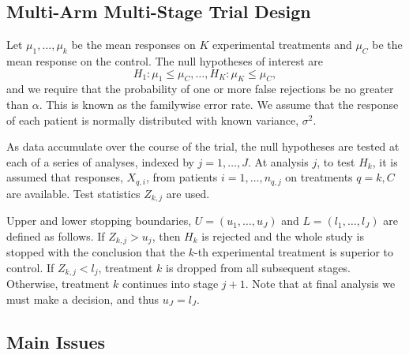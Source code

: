 \documentclass[12pt,a4paper]{article}
\begin{document}
\subsection{Multi-Arm Multi-Stage Trial Design}
	
Let $\mu_1, \dots, \mu_k$ be the mean responses on $K$ experimental treatments and $\mu_C$ be the mean response on the control. The null hypotheses of interest are 
$$H_1: \mu_1 \leq \mu_C, \dots, H_K: \mu_K \leq \mu_C,$$
and we require that the probability of one or more false rejections be no greater than $\alpha$. This is known as the familywise error rate. We assume that the response of each patient is normally distributed with known variance, $\sigma^2$. %
	
As data accumulate over the course of the trial, the null hypotheses are tested at each of a series of analyses, indexed by $j = 1, \dots, J$. At analysis $j$, to test $H_k$, it is assumed that responses, $X_{q,i}$, from patients $i = 1, \dots, n_{q,j}$ on treatments $q = k, C$ are available. Test statistics $Z_{k,j}$ are used. %
	
Upper and lower stopping boundaries, $U = (u_1, \dots, u_J)$ and $L = (l_1, \dots, l_J)$ are defined as follows. If $Z_{k,j} > u_j$, then $H_k$ is rejected and the whole study is stopped with the conclusion that the $k$-th experimental treatment is superior to control. If $Z_{k,j} < l_j$, treatment $k$ is dropped from all subsequent stages. Otherwise, treatment $k$ continues into stage $j+1$. Note that at final analysis we must make a decision, and thus $u_J = l_J$.  %
	

\subsection{Main Issues}
\end{document}
